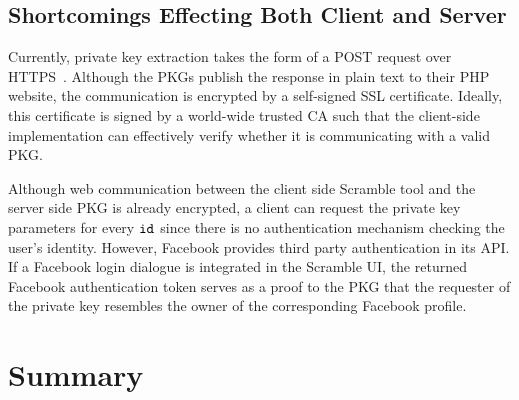 \subsection{Shortcomings Effecting Both Client and Server}
Currently, private key extraction takes the form of a POST request over HTTPS~\cite{rfc2818}. Although the PKGs publish the response in plain text to their PHP website, the communication is encrypted by a self-signed SSL certificate. Ideally, this certificate is signed by a world-wide trusted CA such that the client-side implementation can effectively verify whether it is communicating with a valid PKG.

Although web communication between the client side Scramble tool and the server side PKG is already encrypted, a client can request the private key parameters for every $\mathtt{id}_{}$ since there is no authentication mechanism checking the user's identity. However, Facebook provides third party authentication in its API. If a Facebook login dialogue is integrated in the Scramble UI, the returned Facebook authentication token serves as a proof to the PKG that the requester of the private key resembles the owner of the corresponding Facebook profile.

\section{Summary}

